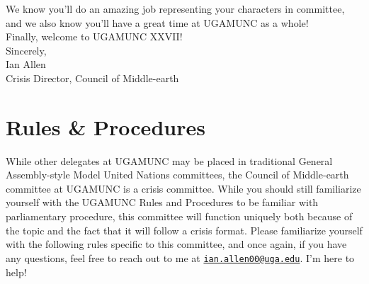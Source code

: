 \documentclass[10pt, letterpaper]{article}
\begin{document}
        \noindent We know you’ll do an amazing job representing your characters in committee, and we also know you’ll have a great time at UGAMUNC as a whole! \\
        
        \noindent Finally, welcome to UGAMUNC XXVII! \\
        
        \noindent Sincerely, \\
        Ian Allen \\
        Crisis Director, Council of Middle-earth
        
        \newpage
        \tableofcontents
        \newpage
        
        \section{Rules \& Procedures}
        While other delegates at UGAMUNC may be placed in traditional General Assembly-style Model United Nations committees, the Council of Middle-earth committee at UGAMUNC is a crisis committee. While you should still familiarize yourself with the UGAMUNC Rules and Procedures to be familiar with parliamentary procedure, this committee will function uniquely both because of the topic and the fact that it will follow a crisis format. Please familiarize yourself with the following rules specific to this committee, and once again, if you have any questions, feel free to reach out to me at \texttt{\href{ian.allen00@uga.edu}{ian.allen00@uga.edu}}. I’m here to help! 
\end{document}
